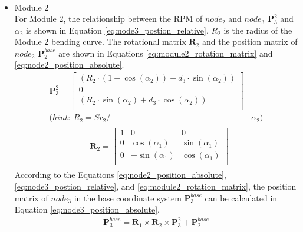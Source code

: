 \begin{itemize}
\begin{align}
    \end{align}
    \item Module 2 \\
    For Module 2, the relationship between the RPM of $node_2$ and $node_3$ $\textbf{P}_{3}^{2}$ 
    and $\alpha_2$ is shown in Equation \ref{eq:node3_postion_relative}. $R_2$ is the radius of the Module 2 bending 
    curve. The rotational matrix $\textbf{R}_{2}$ and the position matrix of $node_2$ $\textbf{P}_{2}^{base}$ are shown 
    in Equations \ref*{eq:module2_rotation_matrix} and \ref{eq:node2_position_absolute}.
    \begin{align}
        \textbf{P}_{3}^{2} = 
        \begin{bmatrix}
            (R_2\cdot(1-\cos(\alpha_2)) + d_3\cdot \sin(\alpha_2)) \\
            0 \\
            (R_2\cdot \sin(\alpha_2) + d_3\cdot \cos(\alpha_2)) \\
        \end{bmatrix}&
        \label{eq:node3_postion_relative} \\
        \nonumber (hint: \ R_2 = {Sr}_2/ &\alpha_2)
    \end{align}
    \vspace{-15mm}
    \begin{align}
        &\begin{aligned}
            \textbf{R}_{2} = 
            \begin{bmatrix}
                1 & 0 & 0 \\
                0 & \cos(\alpha_1) & \sin(\alpha_1) \\
                0 & -\sin(\alpha_1) & \cos(\alpha_1) \\
            \end{bmatrix}
        \end{aligned}
        \label{eq:module2_rotation_matrix}
    \end{align}
    According to the Equations \ref{eq:node2_position_absolute}, \ref{eq:node3_postion_relative}, and 
    \ref*{eq:module2_rotation_matrix}, the position matrix of $node_{3}$ in the base coordinate system 
    $\textbf{P}_{3}^{base}$ can be calculated in Equation \ref{eq:node3_position_absolute}.
    \begin{align}
        \textbf{P}_{3}^{base} = \textbf{R}_{1} \times \textbf{R}_{2} 
        \times \textbf{P}_{3}^{2} + \textbf{P}_{2}^{base}
        \label{eq:node3_position_absolute}
    \end{align}

\end{itemize}
